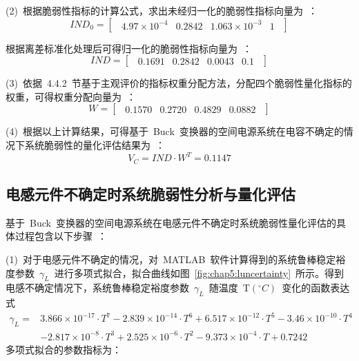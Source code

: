 (2)~根据脆弱性指标的计算公式，求出未经归一化的脆弱性指标向量为~：
\begin{equation}\label{equ:chap5:Index30}
IND_0=\left[
\begin{matrix}
~~4.97\times10^{-4} &0.2842  &1.063\times10^{-3}  &1~~
\end{matrix}
\right]
\end{equation}

根据离差标准化处理后可得归一化的脆弱性指标向量为~：
\begin{equation}\label{equ:chap5:Index31}
IND=\left[
\begin{matrix}
~~0.1691  &0.2842  &0.0043  &0.1~~
\end{matrix}
\right]
\end{equation}

(3)~依据~4.4.2~节基于主观评价的指标权重分配方法，分配四个脆弱性量化指标的权重，可得权重分配向量为~：
\begin{equation}\label{equ:chap5:Index32}
W=\left[
\begin{matrix}
~~0.1570 &0.2720  &0.4829  &0.0882~~
\end{matrix}
\right]
\end{equation}

(4)~根据以上计算结果，可得基于~Buck~变换器的空间电源系统在电容不确定的情况下系统脆弱性的量化评估结果为~：
\begin{equation}\label{equ:chap5:Index33}
V_C=IND\cdot W^T=0.1147
\end{equation}
\subsection{电感元件不确定时系统脆弱性分析与量化评估}
基于~Buck~变换器的空间电源系统在电感元件不确定时系统脆弱性量化评估的具体过程包含以下步骤~：

(1)~对于电感元件不确定的情况，对~MATLAB~软件计算得到的系统鲁棒稳定裕度参数~$\gamma_L$~进行多项式拟合，拟合曲线如图~\ref{fig:chap5:luncertainty}~所示。得到电感不确定情况下，系统鲁棒稳定裕度参数~$\gamma_L$~随温度~T$\left(^{\circ}C\right)$~变化的函数表达式
\begin{equation}\label{equ:chap5:Index34}
\begin{split}
   \gamma_L= &3.866\times10^{-17}\cdot T^7-2.839\times10^{-14}\cdot T^6+6.517\times10^{-12}\cdot T^5-3.46\times10^{-10}\cdot T^4\\
     & -2.817\times10^{-8}\cdot T^3+2.525\times10^{-6}\cdot T^2-9.373\times10^{-4}\cdot T+0.7242
\end{split}
\end{equation}
\newpage
多项式拟合的参数指标为：

